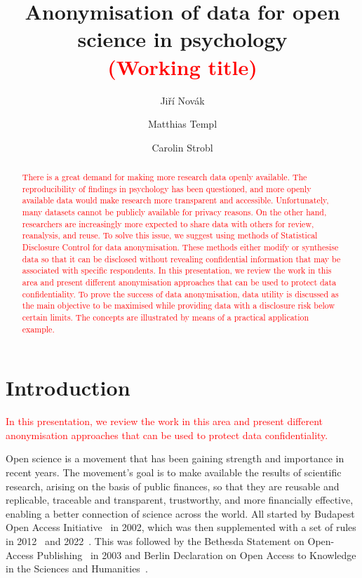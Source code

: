 \documentclass{article}
\title{Anonymisation of data for open science in psychology \\
\textcolor{red}{(Working title)} 
}
\author{Jiří Novák \and 
        Matthias Templ \and 
        Carolin Strobl
        }
\begin{document}
\maketitle

\begin{abstract}
\textcolor{red}{There is a great demand for making more research data openly available. The reproducibility of findings in psychology has been questioned, and more openly available data would make research more transparent and accessible. Unfortunately, many datasets cannot be publicly available for privacy reasons. On the other hand, researchers are increasingly more expected to share data with others for review, reanalysis, and reuse. To solve this issue, we suggest using methods of Statistical Disclosure Control for data anonymisation. These methods either modify or synthesise data so that it can be disclosed without revealing confidential information that may be associated with specific respondents. In this presentation, we review the work in this area and present different anonymisation approaches that can be used to protect data confidentiality. To prove the success of data anonymisation, data utility is discussed as the main objective to be maximised while providing data with a disclosure risk below certain limits. The concepts are illustrated by means of a practical application example.}
\end{abstract}


\section{Introduction}

\textcolor{red}{In this presentation, we review the work in this area and present different anonymisation approaches that can be used to protect data confidentiality.}

Open science is a movement that has been gaining strength and importance in recent years.
The movement's goal is to make available the results of scientific research, arising on the basis of public finances, so that they are reusable and replicable, traceable and transparent, trustworthy, and more financially effective, enabling a better connection of science across the world.
All started by Budapest Open Access Initiative~\cite{2012_OSI} in 2002, which was then supplemented with a set of rules in 2012~\cite{2012_OSI} and 2022~\cite{2022_OSI}.  This was followed by the Bethesda Statement on Open-Access Publishing~\cite{2003_Bethesda} in 2003 and Berlin Declaration on Open Access to Knowledge in the Sciences and Humanities~\cite{2003_Max_Planck}.
\end{document}
